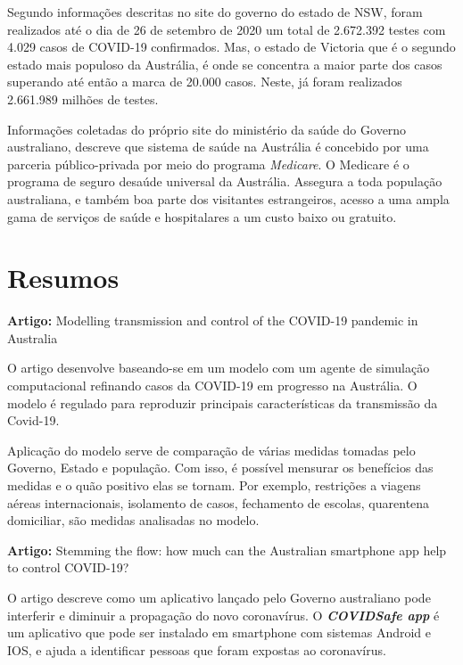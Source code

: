 \documentclass{article}
\begin{document}
Segundo informações descritas no site do governo do estado de NSW, foram realizados até o dia de 26 de setembro de 2020 um total de 2.672.392 testes com 4.029 casos de COVID-19 confirmados. Mas, o estado de Victoria que é o segundo estado mais populoso da Austrália, é onde se concentra a maior parte dos casos superando até então a marca de 20.000 casos. Neste, já foram realizados 2.661.989 milhões de testes.

Informações coletadas do próprio site do ministério da saúde do Governo australiano, descreve que sistema de saúde na Austrália é concebido por uma parceria público-privada por meio do programa \textit{Medicare}. O Medicare é o programa de seguro desaúde universal da Austrália. Assegura a toda população australiana, e também boa parte dos visitantes estrangeiros, acesso a uma ampla gama de serviços de saúde e hospitalares a um custo baixo ou gratuito. 

\section{Resumos}

\begin{center}
	\textbf{Artigo:} Modelling transmission and control of the COVID-19 pandemic in Australia
\end{center}

O artigo desenvolve baseando-se em um modelo com um agente de simulação computacional refinando casos da COVID-19 em progresso na Austrália. O modelo é regulado para reproduzir principais características da transmissão da Covid-19. 

Aplicação do modelo serve de comparação de várias medidas tomadas pelo Governo, Estado e população. Com isso, é possível mensurar os benefícios das medidas e o quão positivo elas se tornam. Por exemplo, restrições a viagens aéreas internacionais, isolamento de casos, fechamento de escolas, quarentena domiciliar, são medidas analisadas no modelo. 

\begin{center}
	\textbf{Artigo:} Stemming the flow: how much can the
	Australian smartphone app help to control
	COVID-19?
\end{center}   

O artigo descreve como um aplicativo lançado pelo Governo australiano pode interferir e diminuir a propagação do novo coronavírus. O \textit{\textbf{COVIDSafe app}} é um aplicativo que pode ser instalado em smartphone com sistemas Android e IOS, e ajuda a identificar pessoas que foram expostas ao coronavírus. 
\end{document}
